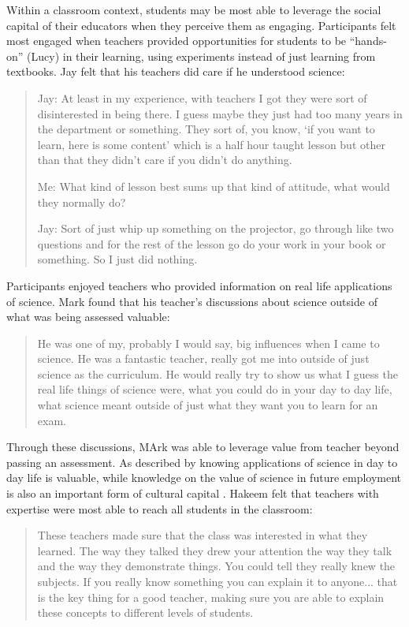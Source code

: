 Within a classroom context, students may be most able to leverage the social capital of their educators when they perceive them as engaging. Participants felt most engaged when teachers provided opportunities for students to be ``hands-on'' (Lucy) in their learning, using experiments instead of just learning from textbooks. Jay felt that his teachers did care if he understood science:  \blockquote{
Jay: At least in my experience, with teachers I got they were sort of disinterested in being there. I guess maybe they just had too many years in the department or something. They sort of, you know, `if you want to learn, here is some content' which is a half hour taught lesson but other than that they didn't care if you didn't do anything.

Me:	What kind of lesson best sums up that kind of attitude, what would they normally do?

Jay: Sort of just whip up something on the projector, go through like two questions and for the rest of the lesson go do your work in your book or something. So I just did nothing. 
}  Participants enjoyed teachers who provided information on real life applications of science. Mark found that his teacher's discussions about science outside of what was being assessed  valuable: \blockquote{He was one of my, probably I would say, big influences when I came to science. He was a fantastic teacher, really got me into outside of just science as the curriculum. He would really try to show us what I guess the real life things of science were, what you could do in your day to day life, what science meant outside of just what they want you to learn for an exam.} Through these discussions, MArk was able to leverage value from teacher beyond passing an assessment. As described by \cite{osborne2003attitudes} knowing applications of science in day to day life is valuable, while knowledge on the value of science in future employment is also an important form of cultural capital \cite{Archer2015a}. Hakeem felt that teachers with expertise were most able to reach all students in the classroom: \blockquote{These teachers made sure that the class was interested in what they learned. The way they talked they drew your attention the way they talk and the way they demonstrate things. You could tell they really knew the subjects. If you really know something you can explain it to anyone... that is the key thing for a good teacher, making sure you are able to explain these concepts to different levels of students.}

